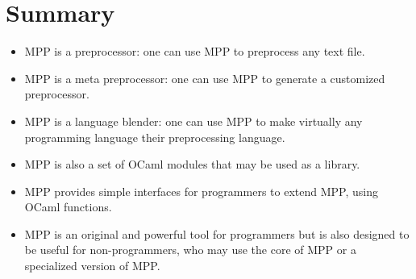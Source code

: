 \documentclass[a4paper]{article}
\begin{document}
\section{Summary}
\begin{itemize}
\item MPP is a preprocessor: one can use MPP to preprocess any text file.

\item MPP is a meta preprocessor: one can use MPP to generate a customized preprocessor.


\item MPP is a language blender: one can use MPP to make virtually any
  programming language their preprocessing language.


\item MPP is also a set of OCaml modules that may be used as a library.


\item MPP provides simple interfaces for programmers to extend MPP, using OCaml functions.


\item MPP  is an  original and  powerful tool  for programmers but is also
designed to be useful for non-programmers, who may use the core of MPP
or a specialized version of MPP.

\end{itemize}
\end{document}
